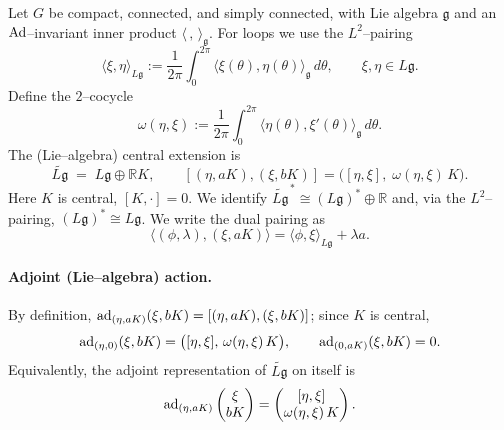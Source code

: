 \documentclass[12pt]{article}
\begin{document}
   \begin{remark}
Let $G$ be compact, connected, and simply connected, with Lie algebra $\mathfrak g$
and an $\operatorname{Ad}$–invariant inner product $\langle\,,\,\rangle_{\mathfrak g}$.
For loops we use the $L^2$–pairing
\[
\langle \xi,\eta\rangle_{L\mathfrak g}
:= \frac{1}{2\pi}\int_0^{2\pi}\langle \xi(\theta),\eta(\theta)\rangle_{\mathfrak g}\,d\theta,
\qquad \xi,\eta\in L\mathfrak g .
\]
Define the $2$–cocycle
\[
\omega(\eta,\xi)
:= \frac{1}{2\pi}\int_0^{2\pi}\!\!\langle \eta(\theta),\xi'(\theta)\rangle_{\mathfrak g}\,d\theta.
\]
The (Lie–algebra) central extension is
\[
\widetilde{L\mathfrak g} \;=\; L\mathfrak g \oplus \mathbb R K,
\qquad
[(\eta,aK),(\xi,bK)]
= \big([\eta,\xi],\;\omega(\eta,\xi)\,K\big).
\]
Here $K$ is central, $[K,\cdot]=0$.
We identify $\widetilde{L\mathfrak g}^{\,*}\cong (L\mathfrak g)^*\oplus\mathbb R$ and,
via the $L^2$–pairing, $(L\mathfrak g)^*\cong L\mathfrak g$.
We write the dual pairing as
\[
\big\langle (\phi,\lambda),(\xi,aK)\big\rangle
= \langle \phi,\xi\rangle_{L\mathfrak g} + \lambda a .
\]

\paragraph{Adjoint (Lie–algebra) action.}
By definition, $\operatorname{ad}_{(\eta,aK)}(\xi,bK)=[(\eta,aK),(\xi,bK)]$; since $K$ is central,
\[
\operatorname{ad}_{(\eta,0)}(\xi,bK) = \big([\eta,\xi],\,\omega(\eta,\xi)\,K\big), \qquad
\operatorname{ad}_{(0,aK)}(\xi,bK)=0 .
\]
Equivalently, the adjoint representation of $\widetilde{L\mathfrak g}$ on itself is
\[
\operatorname{ad}_{(\eta,aK)}
\begin{pmatrix}\xi\\ bK\end{pmatrix}
=
\begin{pmatrix}
[\eta,\xi]\\ \omega(\eta,\xi)\,K
\end{pmatrix}.
\]


\end{remark}
\end{document}
